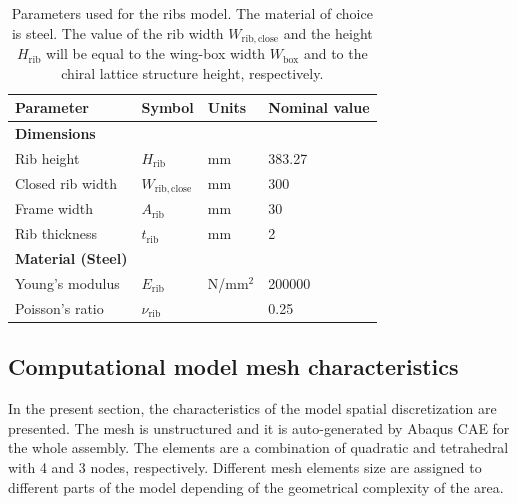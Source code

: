     \begin{table}[!htpb]
    \centering
    \begin{tabular}{|l|lll|}
    \hline
    \textbf{Parameter} & \multicolumn{1}{l|}{\textbf{Symbol}} & \multicolumn{1}{l|}{\textbf{Units}} & \textbf{Nominal value} \\ \hline \hline
    {\textbf{Dimensions}} &  &  &  \\ \hline
    Rib height & \multicolumn{1}{l|}{$H_{\mathrm{rib}}$} & \multicolumn{1}{l|}{mm} & 383.27 \\ \hline
    Closed rib width & \multicolumn{1}{l|}{$W_{\mathrm{rib,close}}$} & \multicolumn{1}{l|}{mm} & 300 \\ \hline
    Frame width & \multicolumn{1}{l|}{$A_{\mathrm{rib}}$} & \multicolumn{1}{l|}{mm} & 30 \\ \hline
    Rib thickness & \multicolumn{1}{l|}{$t_{\mathrm{rib}}$} & \multicolumn{1}{l|}{mm} & 2 \\ \hline \hline
    {\textbf{Material (Steel)}} &  &  &  \\ \hline
    Young's modulus & \multicolumn{1}{l|}{$E_{\mathrm{rib}}$} & \multicolumn{1}{l|}{N/mm$^2$} & 200000 \\ \hline
    Poisson's ratio & \multicolumn{1}{l|}{$\nu_{\mathrm{rib}}$} & \multicolumn{1}{l|}{} & 0.25 \\ \hline
    \end{tabular}
    \caption[Parameters used for the ribs model]{Parameters used for the ribs model. The material of choice is steel. The value of the rib width $W_{\mathrm{rib,close}}$ and the height $H_{\mathrm{rib}}$ will be equal to the wing-box width $W_{\mathrm{box}}$ and to the chiral lattice structure height, respectively.}
    \label{tab:parameters_rib}
    \end{table}

  \clearpage
  \subsection{Computational model mesh characteristics} \label{subsec:mesh_computationalModel}

    In the present section, the characteristics of the model spatial discretization are presented. The mesh is unstructured and it is auto-generated by Abaqus CAE for the whole assembly. The elements are a combination of quadratic and tetrahedral with 4 and 3 nodes, respectively. Different mesh elements size are assigned to different parts of the model depending of the geometrical complexity of the area.

